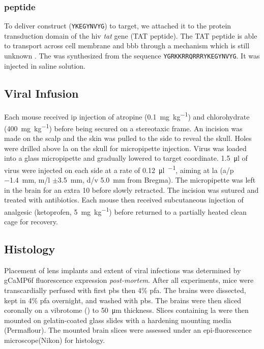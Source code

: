 \subsubsection{\tglu peptide}
To deliver \glu construct (\texttt{YKEGYNVYG}) to target, we attached it to the protein transduction domain of the \gls{hiv} \textit{tat} gene (TAT peptide). The TAT peptide is able to transport across cell membrane and \gls{bbb} through a mechanism which is still unknown . The \tglu was synthesized from the sequence \texttt{YGRKKRRQRRRYKEGYNVYG}. It was injected in saline solution.


\subsection{Viral Infusion}

Each mouse received \gls{ip} injection of atropine (\SI{0.1}{\mg\per\kg}) and chlorohydrate (\SI{400}{\mg\per\kg}) before being secured on a stereotaxic frame. An incision was made on the scalp and the skin was pulled to the side to reveal the skull. Holes were drilled above \gls{la} on the skull for micropipette injection. Virus was loaded into a glass micropipette and gradually lowered to target coordinate. \SI{1.5}{\ul} of virus were injected on each side at a rate of \SI{0.12}{\ul\per\min}, aiming at \gls{la} (\gls{a/p} \SI{-1.4}{\mm}, \gls{m/l} $\pm$\SI{3.5}{\mm}, \gls{d/v} \SI{5.0}{\mm} from Bregma). The micropipette was left in the brain for an extra \SI{10}{\min} before slowly retracted. The incision was sutured and treated with antibiotics. Each mouse then received subcutaneous injection of analgesic (ketoprofen, \SI{5}{\mg\per\kg}) before returned to a partially heated clean cage for recovery.

\subsection{Histology}
Placement of lens implants and extent of viral infections was determined by gCaMP6f fluorescence expression \textit{post-mortem}. After all experiments, mice were transcardially perfused with first \gls{pbs} then 4\% \gls{pfa}. The brains were dissected,  kept in 4\% \gls{pfa} overnight, and washed with \gls{pbs}. The brains were then sliced coronally on a vibrotome () to \SI{50}{\um} thickness. Slices containing \gls{la} were then mounted on gelatin-coated glass slides with a hardening mounting media (Permaflour). The mounted brain slices were assessed under an epi-fluorescence microscope(Nikon) for histology.



